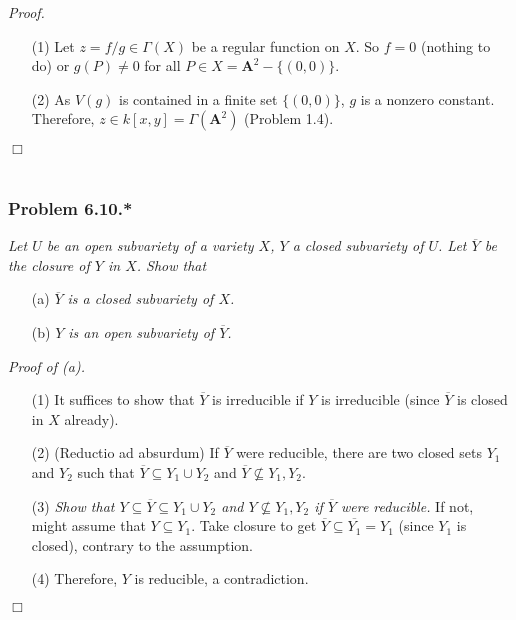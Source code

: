 \documentclass{article}
\begin{document}
\emph{Proof.}
\begin{enumerate}
\item[(1)]
  Let $z = f/g \in \Gamma(X)$ be a regular function on $X$.
  So $f = 0$ (nothing to do) or $g(P) \neq 0$ for all $P \in X = \mathbf{A}^{2} - \{(0,0)\}$.

\item[(2)]
  As $V(g)$ is contained in a finite set $\{(0,0)\}$, $g$ is a nonzero constant.
  Therefore, $z \in k[x,y] = \Gamma(\mathbf{A}^{2})$ (Problem 1.4).
\end{enumerate}
$\Box$ \\\\






\subsubsection*{Problem 6.10.*}
\emph{Let $U$ be an open subvariety of a variety $X$, $Y$ a closed subvariety of $U$.
Let $\overline{Y}$ be the closure of $Y$ in $X$. Show that}
\begin{enumerate}
\item[(a)]
  \emph{$\overline{Y}$ is a closed subvariety of $X$.}

\item[(b)]
  \emph{$Y$ is an open subvariety of $\overline{Y}$.} \\
\end{enumerate}



\emph{Proof of (a).}
\begin{enumerate}
\item[(1)]
  It suffices to show that $\overline{Y}$ is irreducible if $Y$ is irreducible
  (since $\overline{Y}$ is closed in $X$ already).

\item[(2)]
  (Reductio ad absurdum)
  If $\overline{Y}$ were reducible, there are two closed sets $Y_1$ and $Y_2$
  such that $\overline{Y} \subseteq Y_1 \cup Y_2$ and $\overline{Y} \not\subseteq Y_1, Y_2$.

\item[(3)]
  \emph{Show that $Y \subseteq \overline{Y} \subseteq Y_1 \cup Y_2$
  and $Y\not\subseteq Y_1, Y_2$ if $\overline{Y}$ were reducible.}
  If not, might assume that $Y \subseteq Y_1$.
  Take closure to get $\overline{Y} \subseteq \overline{Y_1} = Y_1$ (since $Y_1$ is closed),
  contrary to the assumption.

\item[(4)]
  Therefore, $Y$ is reducible, a contradiction.
\end{enumerate}
$\Box$ \\
\end{document}
